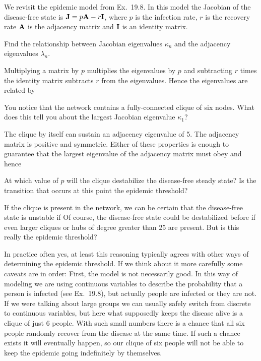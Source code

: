 We revisit the epidemic model from Ex.~19.8. In this model the Jacobian of the disease-free state is ${\bf J}= p {\bf A}- r {\bf I}$, where $p$ is the infection rate, $r$ is the recovery rate $\bf A$ is the adjacency matrix and $\bf I$ is an identity matrix. 

\subquestion
Find the relationship between Jacobian eigenvalues $\kappa_n$ and the adjacency eigenvalues $\lambda_n$.

\solution
Multiplying a matrix by $p$ multiplies the eigenvalues by $p$ and subtracting $r$ times the identity matrix subtracts $r$ from the eigenvalues. Hence the eigenvalues are related by 

\subquestion 
You notice that the network contains a fully-connected clique of six nodes. What does this tell you about the largest Jacobian eigenvalue $\kappa_1$? 

\solution
The clique by itself can sustain an adjacency eigenvalue of 5. The adjacency matrix is positive and symmetric. Either of these properties is enough to guarantee that the largest eigenvalue of the adjacency matrix must obey 
and hence 

\subquestion At which value of $p$ will the clique destabilize the disease-free steady state? Is the transition that occurs at this point the epidemic threshold?  

\solution 
If the clique is present in the network, we can be certain that the disease-free state is unstable if 
Of course, the disease-free state could be destabilized before if even larger cliques or hubs of degree greater than 25 are present. But is this really the epidemic threshold?

In practice often yes, at least this reasoning typically agrees with other ways of determining the epidemic threshold. If we think about it more carefully some caveats are in order: First, the model is not necessarily good. In this way of modeling we are using continuous variables to describe the probability that a person is infected (see Ex.~19.8), but actually people are infected or they are not. If we were talking about large groups we can usually safely switch from discrete to continuous variables, but here what supposedly keeps the disease alive is a clique of just 6 people. With such small numbers there is a chance that all six people randomly recover from the disease at the same time. If such a chance exists it will eventually happen, so our clique of six people will not be able to keep the epidemic going indefinitely by themselves. 


